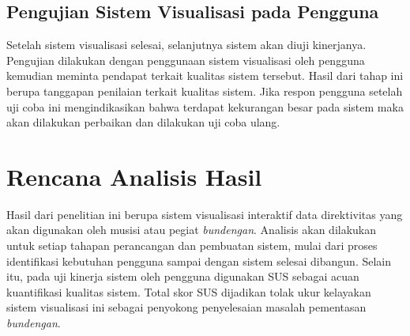 \subsection{Pengujian Sistem Visualisasi pada Pengguna} 
Setelah sistem visualisasi selesai, selanjutnya sistem akan diuji kinerjanya. Pengujian dilakukan dengan penggunaan sistem visualisasi oleh pengguna kemudian meminta pendapat terkait kualitas sistem tersebut. Hasil dari tahap ini berupa tanggapan penilaian terkait kualitas sistem. Jika respon pengguna setelah uji coba ini mengindikasikan bahwa terdapat kekurangan besar pada sistem maka akan dilakukan perbaikan dan dilakukan uji coba ulang. \par 

\section{Rencana Analisis Hasil}
Hasil dari penelitian ini berupa sistem visualisasi interaktif data direktivitas \bundengan yang akan digunakan oleh musisi atau pegiat \textit{bundengan}. Analisis akan dilakukan untuk setiap tahapan perancangan dan pembuatan sistem, mulai dari proses identifikasi kebutuhan pengguna sampai dengan sistem selesai dibangun. Selain itu, pada uji kinerja sistem oleh pengguna digunakan SUS sebagai acuan kuantifikasi kualitas sistem. Total skor SUS dijadikan tolak ukur kelayakan sistem visualisasi ini sebagai penyokong penyelesaian masalah pementasan \textit{bundengan}. \par 





